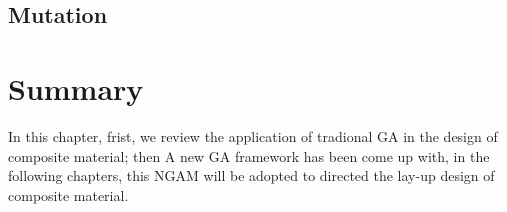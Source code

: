 \subsection{Mutation}


\section{Summary}
In this chapter, frist, we review the application of tradional GA in the design
of composite material; then A new GA framework has been come up with, in the
following chapters, this NGAM will be adopted to directed the lay-up design of
composite material.

